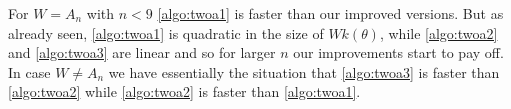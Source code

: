 For $W = A_n$ with $n < 9$ \ref{algo:twoa1} is faster than our improved versions. But as already seen, \ref{algo:twoa1} is quadratic in the size of $Wk(\theta)$, while \ref{algo:twoa2} and \ref{algo:twoa3} are linear and so for larger $n$ our improvements start to pay off. In case $W \neq A_n$ we have essentially the situation that \ref{algo:twoa3} is faster than \ref{algo:twoa2} while \ref{algo:twoa2} is faster than \ref{algo:twoa1}.
